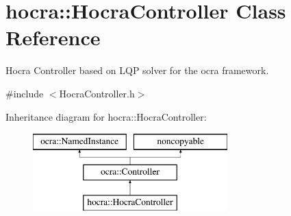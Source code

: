 \hypertarget{classhocra_1_1HocraController}{}\section{hocra\+:\+:Hocra\+Controller Class Reference}
\label{classhocra_1_1HocraController}


Hocra Controller based on L\+QP solver for the ocra framework.  




{\ttfamily \#include $<$Hocra\+Controller.\+h$>$}

Inheritance diagram for hocra\+:\+:Hocra\+Controller\+:\begin{figure}[H]
\begin{center}
\leavevmode
\includegraphics[height=3.000000cm]{d1/d6a/classhocra_1_1HocraController}
\end{center}
\end{figure}

